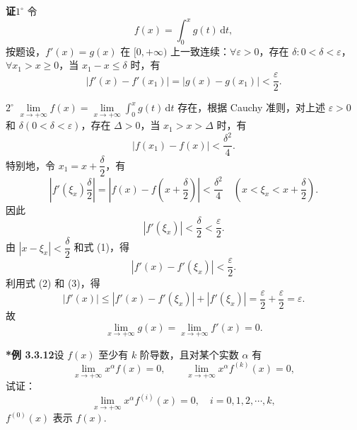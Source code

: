 \documentclass[UTF8,12pt,a4paper,fontset=fandol]{ctexart}
\begin{document}
\noindent\textbf{证}\quad $1^\circ$ 令
\[
  f(x)=\int_0^xg(t)\,\mathrm dt,
\]
按题设，$f'(x)=g(x)$ 在 $[0,+\infty)$ 上一致连续：$\forall\varepsilon>0$，存在 $\delta:0<\delta<\varepsilon$，$\forall x_1>x\ge0$，当 $x_1-x\le\delta$ 时，有
\[
  |f'(x)-f'(x_1)|=|g(x)-g(x_1)|<\frac{\varepsilon}{2}. \tag{1}
\]

$2^\circ$ $\lim\limits_{x\to+\infty}f(x)=\lim\limits_{x\to+\infty}\int_0^xg(t)\,\mathrm dt$ 存在，根据 Cauchy 准则，对上述 $\varepsilon>0$ 和 $\delta(0<\delta<\varepsilon)$，存在 $\Delta>0$，当 $x_1>x>\Delta$ 时，有
\[
  |f(x_1)-f(x)|<\frac{\delta^2}{4}.
\]
特别地，令 $x_1=x+\dfrac{\delta}{2}$，有
\[
  \left|f'(\xi_x)\frac{\delta}{2}\right|
  =\left|f(x)-f\left(x+\frac{\delta}{2}\right)\right|
  <\frac{\delta^2}{4}
  \quad\left(x<\xi_x<x+\frac{\delta}{2}\right).
\]
因此
\[
  |f'(\xi_x)|<\frac{\delta}{2}<\frac{\varepsilon}{2}. \tag{2}
\]
由 $|x-\xi_x|<\dfrac{\delta}{2}$ 和式 (1)，得
\[
  |f'(x)-f'(\xi_x)|<\frac{\varepsilon}{2}. \tag{3}
\]
利用式 (2) 和 (3)，得
\[
  |f'(x)|\le |f'(x)-f'(\xi_x)|+|f'(\xi_x)|=\frac{\varepsilon}{2}+\frac{\varepsilon}{2}=\varepsilon.
\]
故
\[
  \lim_{x\to+\infty}g(x)=\lim_{x\to+\infty}f'(x)=0.
\]

\noindent\textbf{*例 3.3.12}\quad 设 $f(x)$ 至少有 $k$ 阶导数，且对某个实数 $\alpha$ 有
\[
  \lim_{x\to+\infty}x^\alpha f(x)=0,\qquad
  \lim_{x\to+\infty}x^\alpha f^{(k)}(x)=0, \tag{1}
\]
试证：
\[
  \lim_{x\to+\infty}x^\alpha f^{(i)}(x)=0,\quad i=0,1,2,\cdots,k,
\]
$f^{(0)}(x)$ 表示 $f(x)$.
\end{document}
